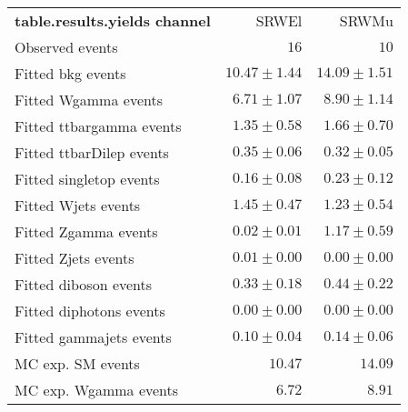 

\begin{table}
\begin{center}
\setlength{\tabcolsep}{0.0pc}
{\small
\begin{tabular*}{\textwidth}{@{\extracolsep{\fill}}lrr}
\noalign{\smallskip}\hline\noalign{\smallskip}
{\bf table.results.yields channel}           & SRWEl            & SRWMu              \\[-0.05cm]
\noalign{\smallskip}\hline\noalign{\smallskip}
Observed events          & $16$              & $10$                    \\
\noalign{\smallskip}\hline\noalign{\smallskip}
Fitted bkg events         & $10.47 \pm 1.44$          & $14.09 \pm 1.51$              \\
\noalign{\smallskip}\hline\noalign{\smallskip}
        Fitted Wgamma events         & $6.71 \pm 1.07$          & $8.90 \pm 1.14$              \\
        Fitted ttbargamma events         & $1.35 \pm 0.58$          & $1.66 \pm 0.70$              \\
        Fitted ttbarDilep events         & $0.35 \pm 0.06$          & $0.32 \pm 0.05$              \\
        Fitted singletop events         & $0.16 \pm 0.08$          & $0.23 \pm 0.12$              \\
        Fitted Wjets events         & $1.45 \pm 0.47$          & $1.23 \pm 0.54$              \\
        Fitted Zgamma events         & $0.02 \pm 0.01$          & $1.17 \pm 0.59$              \\
        Fitted Zjets events         & $0.01 \pm 0.00$          & $0.00 \pm 0.00$              \\
        Fitted diboson events         & $0.33 \pm 0.18$          & $0.44 \pm 0.22$              \\
        Fitted diphotons events         & $0.00 \pm 0.00$          & $0.00 \pm 0.00$              \\
        Fitted gammajets events         & $0.10 \pm 0.04$          & $0.14 \pm 0.06$              \\
 \noalign{\smallskip}\hline\noalign{\smallskip}
MC exp. SM events              & $10.47$          & $14.09$              \\
\noalign{\smallskip}\hline\noalign{\smallskip}
        MC exp. Wgamma events         & $6.72$          & $8.91$              \\

\end{tabular*}}
\end{center}
\end{table}
